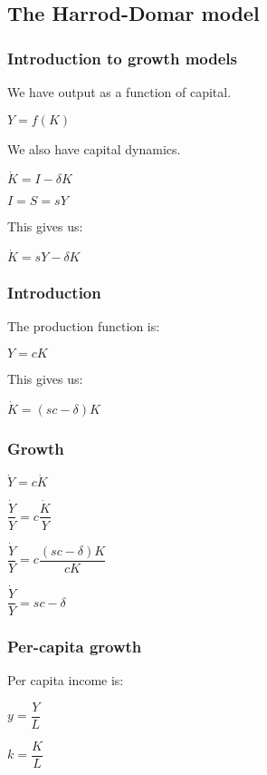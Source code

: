 
\subsection{The Harrod-Domar model}

\subsubsection{Introduction to growth models}

We have output as a function of capital.

\(Y=f(K)\)

We also have capital dynamics.

\(\dot K=I-\delta K\)

\(I=S=sY\)

This gives us:

\(\dot K = sY-\delta K\)

\subsubsection{Introduction}

The production function is:

\(Y=cK\)

This gives us:

\(\dot K=(sc-\delta )K\)

\subsubsection{Growth}

\(\dot Y=c\dot K \)

\(\dfrac{\dot Y}{Y}=c\dfrac{\dot K}{Y}\)

\(\dfrac{\dot Y}{Y}=c\dfrac{(sc-\delta )K}{cK}\)

\(\dfrac{\dot Y}{Y}=sc-\delta \)

\subsubsection{Per-capita growth}

Per capita income is:

\(y=\dfrac{Y}{L}\)

\(k=\dfrac{K}{L}\)


